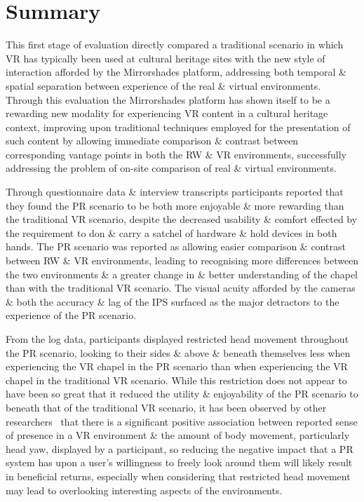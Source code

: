 
\section{Summary}

This first stage of evaluation directly compared a traditional scenario in which VR has typically been used at cultural heritage sites with the new style of interaction afforded by the Mirrorshades platform, addressing both temporal \& spatial separation between experience of the real \& virtual environments. Through this evaluation the Mirrorshades platform has shown itself to be a rewarding new modality for experiencing VR content in a cultural heritage context, improving upon traditional techniques employed for the presentation of such content by allowing immediate comparison \& contrast between corresponding vantage points in both the RW \& VR environments, successfully addressing the problem of on-site comparison of real \& virtual environments.

Through questionnaire data \& interview transcripts participants reported that they found the PR scenario to be both more enjoyable \& more rewarding than the traditional VR scenario, despite the decreased usability \& comfort effected by the requirement to don \& carry a satchel of hardware \& hold devices in both hands. The PR scenario was reported as allowing easier comparison \& contrast between RW \& VR environments, leading to recognising more differences between the two environments \& a greater change in \& better understanding of the chapel than with the traditional VR scenario. The visual acuity afforded by the cameras \& both the accuracy \& lag of the IPS surfaced as the major detractors to the experience of the PR scenario.

From the log data, participants displayed restricted head movement throughout the PR scenario, looking to their sides \& above \& beneath themselves less when experiencing the VR chapel in the PR scenario than when experiencing the VR chapel in the traditional VR scenario. While this restriction does not appear to have been so great that it reduced the utility \& enjoyability of the PR scenario to beneath that of the traditional VR scenario, it has been observed by other researchers~\cite{Slater1998} that there is a significant positive association between reported sense of presence in a VR environment \& the amount of body movement, particularly head yaw, displayed by a participant, so reducing the negative impact that a PR system has upon a user's willingness to freely look around them will likely result in beneficial returns, especially when considering that restricted head movement may lead to overlooking interesting aspects of the environments.

